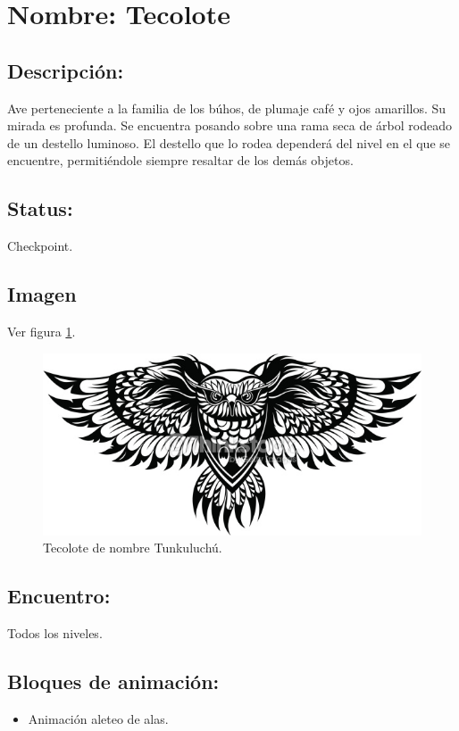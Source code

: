 \section{Nombre: Tecolote}   \label{per:tecolote}
\subsection{Descripción:}
Ave perteneciente a la familia de los búhos, de plumaje café y ojos amarillos. Su mirada es profunda. Se encuentra posando sobre una rama seca de árbol rodeado de un destello luminoso. El destello que lo rodea dependerá del nivel en el que se encuentre, permitiéndole siempre resaltar de los demás objetos.
\subsection{Status:}
Checkpoint.
\subsection{Imagen}
Ver figura \ref{fig:tecolote}.
\begin{figure}
	\centering
	\includegraphics[height=0.2 \textheight]{Imagenes/tecolote}
	\caption{Tecolote de nombre Tunkuluchú.}
	\label{fig:tecolote}
\end{figure}
\subsection{Encuentro:}
Todos los niveles.
\subsection{Bloques de animación:}
\begin{itemize}
	\item Animación aleteo de alas.
\end{itemize}